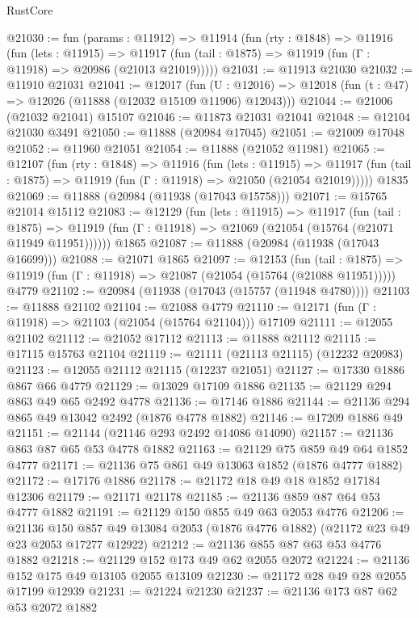 \begin{lexlean}{RustCore}
\begin{coremodule}
@21030 := fun (params : @11912) =>
  @11914
    (fun (rty : @1848) =>
    @11916
      (fun (lets : @11915) =>
      @11917 (fun (tail : @1875) => @11919 (fun (Γ : @11918) => @20986 (@21013 @21019)))))
@21031 := @11913 @21030
@21032 := @11910 @21031
@21041 := @12017
    (fun (U : @12016) => @12018 (fun (t : @47) => @12026 (@11888 (@12032 @15109 @11906) @12043)))
@21044 := @21006 (@21032 @21041) @15107
@21046 := @11873 @21031 @21041
@21048 := @12104 @21030 @3491
@21050 := @11888 (@20984 @17045)
@21051 := @21009 @17048
@21052 := @11960 @21051
@21054 := @11888 (@21052 @11981)
@21065 := @12107
    (fun (rty : @1848) =>
    @11916
      (fun (lets : @11915) =>
      @11917 (fun (tail : @1875) => @11919 (fun (Γ : @11918) => @21050 (@21054 @21019)))))
    @1835
@21069 := @11888 (@20984 (@11938 (@17043 @15758)))
@21071 := @15765 @21014 @15112
@21083 := @12129
    (fun (lets : @11915) =>
    @11917
      (fun (tail : @1875) =>
      @11919 (fun (Γ : @11918) => @21069 (@21054 (@15764 (@21071 @11949 @11951))))))
    @1865
@21087 := @11888 (@20984 (@11938 (@17043 @16699)))
@21088 := @21071 @1865
@21097 := @12153
    (fun (tail : @1875) => @11919 (fun (Γ : @11918) => @21087 (@21054 (@15764 (@21088 @11951)))))
    @4779
@21102 := @20984 (@11938 (@17043 (@15757 (@11948 @4780))))
@21103 := @11888 @21102
@21104 := @21088 @4779
@21110 := @12171 (fun (Γ : @11918) => @21103 (@21054 (@15764 @21104))) @17109
@21111 := @12055 @21102
@21112 := @21052 @17112
@21113 := @11888 @21112
@21115 := @17115 @15763 @21104
@21119 := @21111 (@21113 @21115) (@12232 @20983)
@21123 := @12055 @21112 @21115 (@12237 @21051)
@21127 := @17330 @1886 @867 @66 @4779
@21129 := @13029 @17109 @1886
@21135 := @21129 @294 @863 @49 @65 @2492 @4778
@21136 := @17146 @1886
@21144 := @21136 @294 @865 @49 @13042 @2492 (@1876 @4778 @1882)
@21146 := @17209 @1886 @49
@21151 := @21144 (@21146 @293 @2492 @14086 @14090)
@21157 := @21136 @863 @87 @65 @53 @4778 @1882
@21163 := @21129 @75 @859 @49 @64 @1852 @4777
@21171 := @21136 @75 @861 @49 @13063 @1852 (@1876 @4777 @1882)
@21172 := @17176 @1886
@21178 := @21172 @18 @49 @18 @1852 @17184 @12306
@21179 := @21171 @21178
@21185 := @21136 @859 @87 @64 @53 @4777 @1882
@21191 := @21129 @150 @855 @49 @63 @2053 @4776
@21206 := @21136
    @150
    @857
    @49
    @13084
    @2053
    (@1876 @4776 @1882)
    (@21172 @23 @49 @23 @2053 @17277 @12922)
@21212 := @21136 @855 @87 @63 @53 @4776 @1882
@21218 := @21129 @152 @173 @49 @62 @2055 @2072
@21224 := @21136 @152 @175 @49 @13105 @2055 @13109
@21230 := @21172 @28 @49 @28 @2055 @17199 @12939
@21231 := @21224 @21230
@21237 := @21136 @173 @87 @62 @53 @2072 @1882

\end{coremodule}
\end{lexlean}
